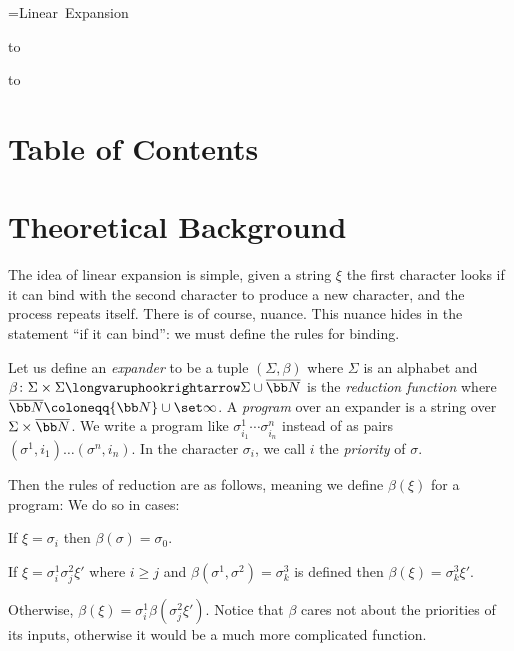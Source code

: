 




{=\hbox{Linear Expansion}
\centerline{
    \vbox{
        \smallskip
        \hbox to
    }
}}

\bigskip
\hbox to

\section*{Table of Contents}

\tableofcontents

\vfill\break

\section{Theoretical Background}

The idea of linear expansion is simple, given a string $\xi$ the first character looks if it can bind with the second character to produce a new character, and the process repeats itself.
There is of course, nuance.
This nuance hides in the statement ``if it can bind'': we must define the rules for binding.

Let us define an {\it expander} to be a tuple $(\Sigma,\beta)$ where $\Sigma$ is an alphabet  and $\beta\colon\Sigma\times\Sigma\longvaruphookrightarrow\Sigma\cup\overline{\bb N}$ is the
{\it reduction function} where $\overline{\bb N}\coloneqq{\bb N}\cup\set\infty$.
A {\it program} over an expander is a string over $\Sigma\times\overline{\bb N}$.
We write a program like $\sigma^1_{i_1}\cdots\sigma^n_{i_n}$ instead of as pairs $(\sigma^1,i_1)\dots(\sigma^n,i_n)$.
In the character $\sigma_i$, we call $i$ the {\it priority} of $\sigma$.

Then the rules of reduction are as follows, meaning we define $\beta(\xi)$ for a program:
We do so in cases:
\benum
    \item If $\xi=\sigma_i$ then $\beta(\sigma)=\sigma_0$.
    \item If $\xi=\sigma^1_i\sigma^2_j\xi'$ where $i\geq j$ and $\beta(\sigma^1,\sigma^2)=\sigma^3_k$ is defined then $\beta(\xi)=\sigma^3_k\xi'$.
    \item Otherwise, $\beta(\xi)=\sigma^1_i\beta(\sigma^2_j\xi')$.
\eenum
Notice that $\beta$ cares not about the priorities of its inputs, otherwise it would be a much more complicated function.

